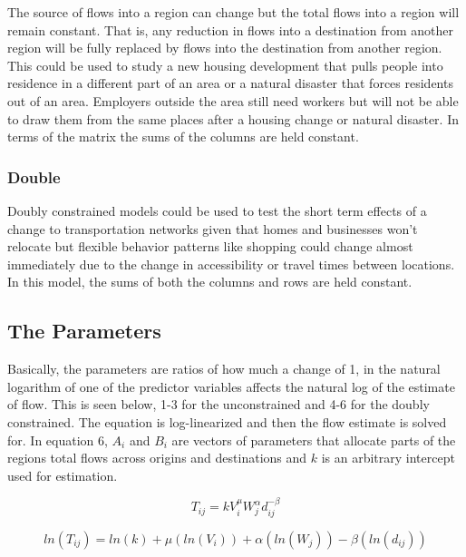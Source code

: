 \documentclass[11pt]{article} %
\begin{document}
The source of flows into a region can change but the total flows into a region will remain constant. That is, any reduction in flows into a destination from another region will be fully replaced by flows into the destination from another region.  This could be used to study a new housing development that pulls people into residence in a different part of an area or a natural disaster that forces residents out of an area. Employers outside the area still need workers but will not be able to draw them from the same places after a housing change or natural disaster. In terms of the matrix the sums of the columns are held constant.

\subsubsection{Double}

Doubly constrained models could be used to test the short term effects of a change to transportation networks given that homes and businesses won't relocate but flexible behavior patterns like shopping could change almost immediately due to the change in accessibility or travel times between locations. In this model, the sums of both the columns and rows are held constant.

\subsection{The Parameters}

Basically, the parameters are ratios of how much a change of 1, in the natural logarithm of one of the predictor variables affects the natural log of the estimate of flow. This is seen below, 1-3 for the unconstrained and 4-6 for the doubly constrained. The equation is log-linearized and then the flow estimate is solved for. In equation 6, $A_i$ and $B_i$ are vectors of parameters that allocate parts of the regions total flows across origins and destinations and $k$ is an arbitrary intercept used for estimation. 

\begin{equation}
T_{ij} = k V_i ^{\mu} W_j^{\alpha} d_{ij}^{-\beta}
\end{equation}

\begin{equation}
ln(T_{ij}) = ln(k) + \mu (ln(V_i)) +  \alpha( ln(W_j)) - \beta (ln(d_{ij}))
\end{equation}
\end{document}
